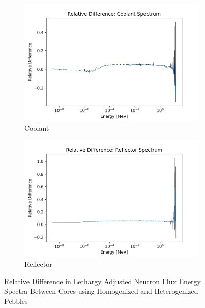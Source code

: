\begin{figure}[h!]
\begin{subfigure}{0.25\textwidth}
  \includegraphics[width=0.95\linewidth]{figures/reldiff_cool_spec}
  \caption{Coolant}
  \label{fig:diff-cool}
\end{subfigure}%
%
\begin{subfigure}{0.25\textwidth}
  \includegraphics[width=0.95\linewidth]{figures/reldiff_reflec_spec}
  \caption{Reflector}
  \label{fig:diff-reflec}
\end{subfigure}%
%

\caption{Relative Difference in Lethargy Adjusted Neutron Flux Energy Spectra Between Cores using Homogenized and Heterogenized Pebbles}
\label{fig:diff-spec}
\end{figure}